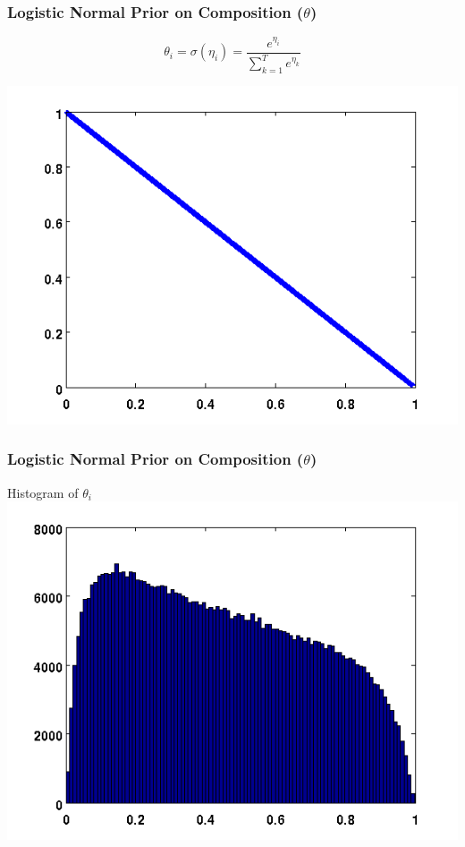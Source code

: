 \documentclass{beamer}
\begin{document}
\begin{frame}
  \frametitle{Logistic Normal Prior on Composition ($\theta$)}
  \begin{center}
    \vspace{-0.3in}
    \begin{equation*}
      \theta_i = \sigma(\eta_i) = \frac{e^{\eta_i}}{\sum_{k=1}^{T}e^{\eta_k}}
    \end{equation*}

    \includegraphics[scale=0.5]{img/log-normal-figs/log-normal-1.png}
  \end{center}
\end{frame}

\begin{frame}
  \frametitle{Logistic Normal Prior on Composition ($\theta$)}
  \begin{center}
    Histogram of $\theta_i$
    \includegraphics[scale=0.6]{img/log-normal-figs/hist-1.png}
  \end{center}
\end{frame}
\end{document}
